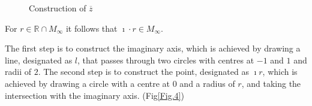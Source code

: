 \begin{figure}[h]
    \centering
    \caption{Construction of $\overline{z}$}
    \label{Fig.3}
\end{figure}


\begin{lemma}
    \label{lem:construction_imath_r}
    \leanok
    For $r \in \mathbb{R}\cap M_{\infty}$ it follows that $\imath\cdot r \in M_{\infty}$.
\end{lemma}
The first step is to construct the imaginary axis, which is achieved by drawing a line, designated as $l$, that passes through two circles with centres at $-1$ and $1$ and radii of $2$. 
The second step is to construct the point, designated as $\imath r$, which is achieved by drawing a circle with a centre at $0$ and a radius of $r$, and taking the intersection with the imaginary axis. (Fig\ref{Fig.4})
